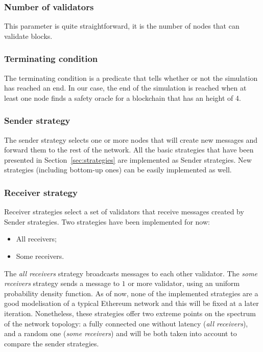 \subsubsection{Number of validators}
This parameter is quite straightforward, it is the number of nodes that can
validate blocks.

\subsubsection{Terminating condition}
The terminating condition is a predicate that tells whether or not the simulation has
reached an end. In our case, the end of the simulation is reached when at least
one node finds a safety oracle for a blockchain that has an height of 4.

\subsubsection{Sender strategy}
The sender strategy selects one or more nodes that will create new messages and
forward them to the rest of the network. All the basic strategies that have been
presented in Section~\ref{sec:strategies} are implemented as Sender strategies.
New strategies (including bottom-up ones) can be easily implemented as well.

\subsubsection{Receiver strategy}
Receiver strategies select a set of validators that receive messages created by
Sender strategies. Two strategies have been implemented for now: 
\begin{itemize}
        \item All receivers;
        \item Some receivers.
\end{itemize}

The \textit{all receivers} strategy broadcasts messages to each other validator.
The \textit{some receivers} strategy sends a message to \(1\) or more validator,
using an uniform probability density function.  As of now, none of the
implemented strategies are a good modelisation of a typical Ethereum network and
this will be fixed at a later iteration.  Nonetheless, these strategies offer
two extreme points on the spectrum of the network topology: a fully connected
one without latency (\textit{all receivers}), and a random one (\textit{some
receivers}) and will be both taken into account to compare the sender
strategies.

